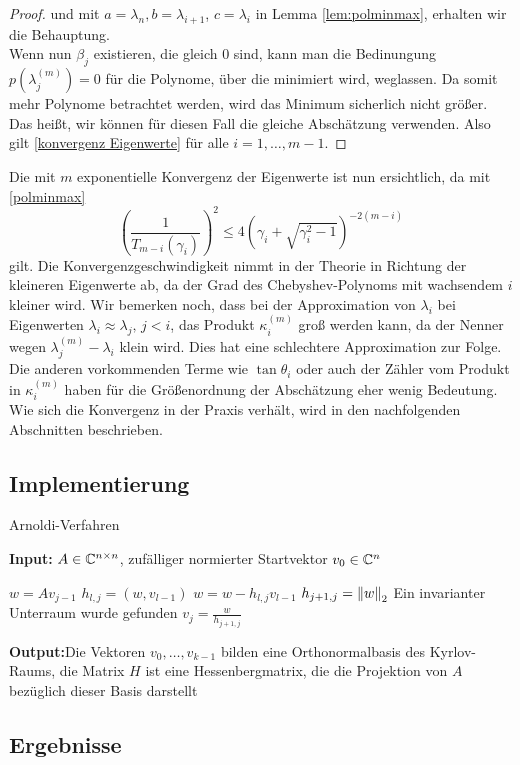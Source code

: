\documentclass{article}
\begin{document}
\begin{theorem}
\begin{proof}
	und  mit $a = \lambda_n, b= \lambda_{i+1}$, $c = \lambda_i$ in Lemma \ref{lem:polminmax}, erhalten wir die Behauptung.\\

	Wenn nun $\beta_j$ existieren, die gleich 0 sind, kann man die Bedinungung $p(\lambda_j^{(m)}) = 0$ für die Polynome, über die minimiert wird, weglassen.
	Da somit mehr Polynome betrachtet werden, wird das Minimum sicherlich nicht größer. Das heißt, wir können für diesen Fall die gleiche Abschätzung verwenden.
	Also gilt \eqref{konvergenz Eigenwerte} für alle $i = 1, \dots, m-1$.
	\end{proof}
\end{theorem}

Die mit $m$ exponentielle Konvergenz der Eigenwerte ist nun ersichtlich, da mit \eqref{polminmax}
\begin{equation*}
	\left(\frac{1}{T_{m-i}(\gamma_i)}\right)^2 \le 4 \left(\gamma_i + \sqrt{\gamma_i^2 -1}\right)^{-2(m-i)}
\end{equation*}
gilt. Die Konvergenzgeschwindigkeit nimmt in der Theorie in Richtung der kleineren Eigenwerte ab, da der Grad des Chebyshev-Polynoms mit wachsendem $i$ kleiner wird. Wir bemerken noch, dass bei der Approximation von $\lambda_i$ bei Eigenwerten $\lambda_i \approx \lambda_j, \, j < i$, das Produkt $\kappa_i^{(m)}$ groß werden kann, da der Nenner wegen $\lambda^{(m)}_j - \lambda_i$ klein wird. Dies hat eine schlechtere Approximation zur Folge. Die anderen vorkommenden Terme wie $\tan \theta_i$ oder auch der Zähler vom Produkt in $\kappa_i^{(m)}$ haben für die Größenordnung der Abschätzung eher wenig Bedeutung. Wie sich die Konvergenz in der Praxis verhält, wird in den nachfolgenden Abschnitten beschrieben.


\subsection{Implementierung}
\renewcommand{\algorithmicrequire}{\textbf{Input:}}
\renewcommand{\algorithmicensure}{\textbf{Output:}}

\begin{algorithm}

	\caption{Arnoldi-Verfahren}
	\label{Arnoldi-Verfahren}
	\algorithmicrequire{ $A \in \C^{n\times n}$, zufälliger normierter Startvektor $v_0 \in \C^n$}
	\begin{algorithmic}[1]
			\State $w = A v_{j-1}$
				\State $h_{l,j} = (w, v_{l-1})$
				\State $w = w - h_{l,j}v_{l-1}$
			\EndFor
			\State $h_{j+1,j} = \norm[2]{w}$
			\State Ein invarianter Unterraum wurde gefunden
			\Else
				\State $v_j = \frac{w}{h_{j+1,j}}$
			\EndIf
		\EndFor
	\end{algorithmic}
	\algorithmicensure{Die Vektoren $v_0,\dots,v_{k-1}$ bilden eine Orthonormalbasis des Kyrlov-Raums, die Matrix $H$ ist eine Hessenbergmatrix, die die Projektion von $A$ bezüglich dieser Basis darstellt}
\end{algorithm}

\subsection{Ergebnisse}


\newpage

\printbibliography
\end{document}
